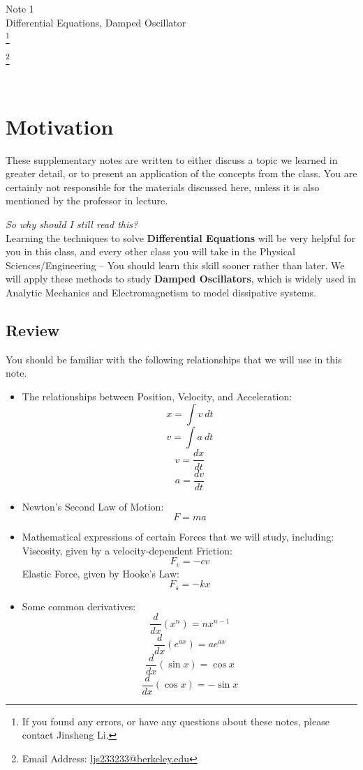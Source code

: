 \documentclass[11pt]{article}
\newcommand\blfootnote[1]{
    \begingroup
    \renewcommand\thefootnote{}\footnote{#1}
    \addtocounter{footnote}{-1}
    \endgroup
}
\theoremstyle{gangnamstyle}{\newtheorem{definition}{Definition}[]}
\theoremstyle{gangnamstyle}{\newtheorem{example}{Example}[]}
\theoremstyle{gangnamstyle}{\newtheorem{problem}{Problem}[]}
\theoremstyle{gangnamstyle}{\newtheorem{warning}{Warning}[]}
\begin{document}
\normalfont
\pagestyle{pages}


\begin{center}
\vspace{3in}
{\Large Note 1 } \\[0.05in]
Differential Equations, Damped Oscillator  \\ 
\blfootnote{If you found any errors, or have any questions about these notes, please contact Jinsheng Li.} \blfootnote{Email Address: \href{mailto:ljs233233@berkeley.edu}{ljs233233@berkeley.edu}} \\ [-0.5in]
\end{center}

\section*{Motivation}

These supplementary notes are written to either discuss a topic we learned in greater detail, or to present an application of the concepts from the class. You are certainly not responsible for the materials discussed here, unless it is also mentioned by the professor in lecture. 

\textit{So why should I still read this?} \\
Learning the techniques to solve \textbf{Differential Equations} will be very helpful for you in this class, and every other class you will take in the Physical Sciences/Engineering -- You should learn this skill sooner rather than later. We will apply these methods to study \textbf{Damped Oscillators}, which is widely used in Analytic Mechanics and Electromagnetism to model dissipative systems. 

\subsection*{Review}

You should be familiar with the following relationships that we will use in this note. 

\begin{itemize}
\item The relationships between Position, Velocity, and Acceleration: 
\[ x = \int v \ dt \]
\[ v = \int a \ dt \]
\[ v = \frac{dx}{dt}\]
\[ a = \frac{dv}{dt} \]
\item Newton's Second Law of Motion: 
\[ F = ma \]
\item Mathematical expressions of certain Forces that we will study, including: \\
Viscosity, given by a velocity-dependent Friction: 
\[ F_v = -cv \]
Elastic Force, given by Hooke's Law: 
\[ F_s = -kx \]
\item Some common derivatives: 
\[ \frac{d}{dx}(x^n) = nx^{n - 1} \]
\[ \frac{d}{dx}(e^{ax}) = ae^{ax} \]
\[ \frac{d}{dx}(\sin x) = \cos x \]
\[ \frac{d}{dx}(\cos x) = -\sin x \]
\end{itemize}
\pagebreak
\end{document}
